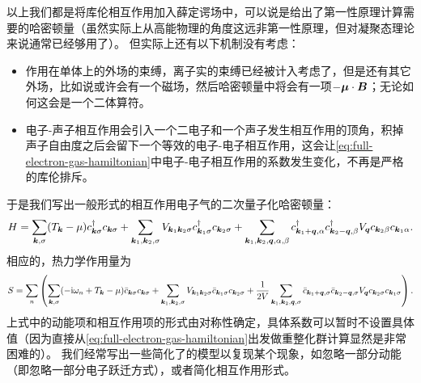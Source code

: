 以上我们都是将库伦相互作用加入薛定谔场中，可以说是给出了第一性原理计算需要的哈密顿量（虽然实际上从高能物理的角度这远非第一性原理，但对凝聚态理论来说通常已经够用了）。
但实际上还有以下机制没有考虑：
\begin{itemize}
    \item 作用在单体上的外场的束缚，离子实的束缚已经被计入考虑了，但是还有其它外场，比如说或许会有一个磁场，然后哈密顿量中将会有一项$-\vb*{\mu} \cdot \vb*{B}$；无论如何这会是一个二体算符。
    \item 电子-声子相互作用会引入一个二电子和一个声子发生相互作用的顶角，积掉声子自由度之后会留下一个等效的电子-电子相互作用，这会让\eqref{eq:full-electron-gas-hamiltonian}中电子-电子相互作用的系数发生变化，不再是严格的库伦排斥。
\end{itemize}
于是我们写出一般形式的相互作用电子气的二次量子化哈密顿量：
\begin{equation}
    {H} = \sum_{\vb*{k}, \sigma} (T_{\vb*{k}} - \mu) {c}^\dagger_{\vb*{k} \sigma} {c}_{\vb*{k} \sigma} 
    + \sum_{\vb*{k}_1, \vb*{k}_2, \sigma} V_{\vb*{k}_1 \vb*{k}_2 \sigma} {c}^\dagger_{\vb*{k}_1 \sigma} {c}_{\vb*{k}_2 \sigma}
    + \sum_{\vb*{k}_1, \vb*{k}_2, \vb*{q}, \alpha, \beta} {c}^\dagger_{\vb*{k}_1+\vb*{q}, \alpha} {c}^\dagger_{\vb*{k}_2-\vb*{q}, \beta} V_{\vb*{q}} {c}_{\vb*{k}_2 \beta} {c}_{\vb*{k}_1 \alpha}. 
\end{equation}
相应的，热力学作用量为
\begin{equation}
    S = \sum_n \left( 
        \sum_{\vb*{k}, \sigma} (-\mathrm{i} \omega_n + T_{\vb*{k}} - \mu) \bar{c}_{\vb*{k} \sigma} c_{\vb*{k} \sigma} 
        + \sum_{\vb*{k}_1, \vb*{k}_2, \sigma} V_{\vb*{k}_1 \vb*{k}_2 \sigma} \bar{c}_{\vb*{k}_1 \sigma} c_{\vb*{k}_2 \sigma} 
        + \frac{1}{2V} \sum_{\vb*{k}_1, \vb*{k}_2, \vb*{q}, \sigma} \bar{c}_{\vb*{k}_1+\vb*{q}, \sigma} \bar{c}_{\vb*{k}_2-\vb*{q}, \sigma} V_{\vb*{q}} c_{\vb*{k}_2 \sigma} c_{\vb*{k}_1 \sigma} \right). 
        \label{eq:general-electron-electron-interaction}
\end{equation}
上式中的动能项和相互作用项的形式由对称性确定，具体系数可以暂时不设置具体值（因为直接从\eqref{eq:full-electron-gas-hamiltonian}出发做重整化群计算显然是非常困难的）。
我们经常写出一些简化了的模型以复现某个现象，如忽略一部分动能（即忽略一部分电子跃迁方式），或者简化相互作用形式。

